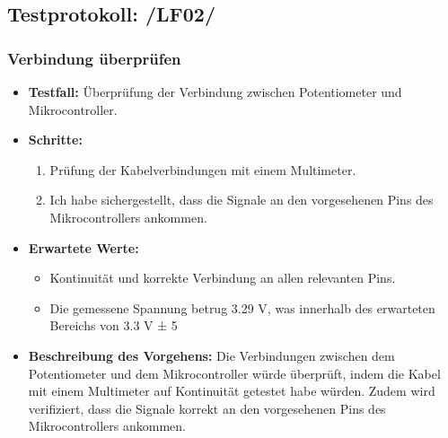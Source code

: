\subsection{Testprotokoll: /LF02/}

\subsubsection{Verbindung überprüfen}
\begin{itemize}
	\item \textbf{Testfall:} Überprüfung der Verbindung zwischen Potentiometer und Mikrocontroller.
	\item \textbf{Schritte:}
	\begin{enumerate}
		\item Prüfung der Kabelverbindungen mit einem Multimeter.
		\item Ich habe sichergestellt, dass die Signale an den vorgesehenen Pins des Mikrocontrollers ankommen.
	\end{enumerate}
	\item \textbf{Erwartete Werte:}
	\begin{itemize}
		\item Kontinuität und korrekte Verbindung an allen relevanten Pins.
		\item Die gemessene Spannung betrug 3.29 V, was innerhalb des erwarteten Bereichs von 3.3 V ± 5%
	\end{itemize}
	\item \textbf{Beschreibung des Vorgehens:}
	Die Verbindungen zwischen dem Potentiometer und dem Mikrocontroller würde überprüft, indem die Kabel mit einem Multimeter auf Kontinuität getestet habe würden. Zudem wird verifiziert, dass die Signale korrekt an den vorgesehenen Pins des Mikrocontrollers ankommen.
\end{itemize}


